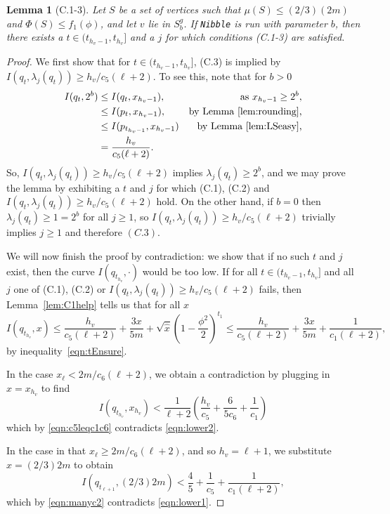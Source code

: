 \documentclass[11pt]{article}
\newtheorem{lemma}[theorem]{Lemma}
\newcommand{\lamj}[2]{\lambda_{#1} (#2)}
\def\vol#1{\mu \left(#1  \right)}
\begin{document}
\begin{lemma}[C.1-3]\label{lem:C123}
Let $S$ be a set of vertices such that
 $\vol{S} \leq (2/3) (2m)$ and
  $\Phi (S) \leq  f_{1} (\phi )$, and
  let $v$ lie in $S^{g}_{b}$.
If \texttt{Nibble} is run with parameter $b$,
  then there exists a $t \in ( t_{h_{v}-1}, t_{h_{v}}]$ and a $j$
  for which conditions (C.1-3) are satisfied.
\end{lemma}
\begin{proof}
We first show that for $t \in ( t_{h_{v}-1}, t_{h_{v}}]$, (C.3) is implied
  by $I (q_{t}, \lambda_{j} (q_{t})) \geq h_{v}/c_{5} (\ell + 2)$.
To see  this, note that for $b > 0$
\begin{align*}
I (q_{t}, 2^{b}) 
& \leq 
I (q_{t}, x_{h_{v}-1}),
& \text{as $x_{h_{v}-1} \geq 2^{b}$,}
\\
& \leq 
I (p_{t}, x_{h_{v}-1}),
& \text{by Lemma~\ref{lem:rounding},}
\\
& \leq 
I (p_{t_{h_{v}-1}}, x_{h_{v}-1})
& \text{by Lemma~\ref{lem:LSeasy},}
\\
& =
\frac{h_{v}}{c_{5} (\ell + 2)}.
\end{align*}
So, $I (q_{t}, \lambda_{j} (q_{t})) \geq h_{v}/ c_{5} (\ell + 2)$
  implies $\lambda_{j} (q_{t}) \geq 2^{b}$,
 and we may prove the lemma by exhibiting a $t$ and $j$ for which
  (C.1), (C.2) and $I (q_{t}, \lambda_{j} (q_{t})) \geq h_{v}/ c_{5} (\ell + 2)$
  hold.
On the other hand, if $b = 0$ then $\lamj{j}{q_{t}} \geq 1 = 2^{b}$
  for all $j \geq 1$, so $I (q_{t}, \lambda_{j} (q_{t})) \geq h_{v}/ c_{5} (\ell + 2)$
  trivially implies $j \geq 1$ and therefore $(C.3)$.

We will now finish the proof by contradiction: we show that if no
  such $t$ and $j$ exist, then the curve $I (q_{t_{h_{v}}}, \cdot)$
  would be too low.
If for all  $t \in ( t_{h_{v}-1}, t_{h_{v}}]$
  and all $j$ one of (C.1), (C.2) or 
  $I (q_{t}, \lambda_{j} (q_{t})) \geq h_{v}/ c_{5} (\ell + 2)$ fails,
  then Lemma~\ref{lem:C1help} tells us that for all $x$
\[
  I (q_{t_{h_{v}}}, x)
\leq
  \frac{h_{v}}{c_{5} (\ell + 2)} + \frac{3 x}{5 m}
+
  \sqrt{\widehat{x}} \left(1 - \frac{\phi^{2}}{2} \right)^{t_{1}}
\leq
  \frac{h_{v}}{c_{5} (\ell + 2)} + \frac{3 x}{5 m}
 +\frac{1}{c_{1} (\ell + 2)},
\]
by inequality~\eqref{eqn:tEnsure}.

In the case $x_{\ell} < 2 m / c_{6} (\ell +2)$,
  we obtain a contradiction by 
  plugging in $x = x_{h_{v}}$  to find
\[
  I (q_{t_{h_{v}}}, x_{h_{v}})
<
\frac{1}{\ell + 2}
\left(
 \frac{h_{v}}{c_{5}} + \frac{6}{5 c_{6}} + \frac{1}{c_{1}}
 \right)
\]
which by \eqref{eqn:c5leqc1c6} contradicts \eqref{eqn:lower2}.

In the case in that $x_{\ell} \geq  2 m / c_{6} (\ell +2)$,
  and so $h_{v} = \ell + 1$, we
  substitute $x = (2/3)2m$ to obtain
\[
  I (q_{t_{\ell +1}}, (2/3) 2m)
<
\frac{4}{5}
+
 \frac{1}{c_{5}}
 +
\frac{1}{c_{1} (\ell +2)},
\]
which by \eqref{eqn:manyc2} contradicts \eqref{eqn:lower1}.
\end{proof}
\end{document}
